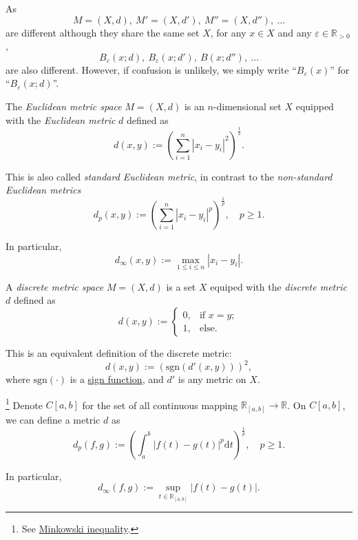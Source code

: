 \begin{note}
	As
	$$
	M = (X, d), \ M' = (X, d'), \ M'' = (X, d''), \ \ldots
	$$
	are different although they share the same set $X$, for any $x \in X$ and any $\varepsilon \in \mathbb R_{> 0}$,
	$$
	B_\varepsilon(x; d),\ B_\varepsilon (x; d'), \ B(x; d''), \ \ldots
	$$
	are also different. However, if confusion is unlikely, we simply write ``$B_\varepsilon(x)$'' for ``$B_\varepsilon(x; d)$''.
\end{note}


\begin{example}
	The \textit{Euclidean metric space} $M = (X, d)$ is an $n$-dimensional set $X$ equipped with the \textit{Euclidean metric} $d$ defined as
	$$
	d(x,y) := \left( \sum_{i = 1}^n |x_i - y_i|^2 \right)^\frac{1}{2}.
	$$
	
	This is also called \textit{standard Euclidean metric}, in contrast to the \textit{non-standard Euclidean metrics}
	$$
	d_p(x,y) := \left( \sum_{i = 1}^n |x_i - y_i|^p \right)^\frac{1}{p}, \quad p \ge 1.
	$$
	
	In particular,
	$$
	d_\infty (x,y) := \max_{1 \le i \le n} |x_i - y_i|.
	$$
\end{example}


\begin{example}
	A \textit{discrete metric space} $M = (X, d)$ is a set $X$ equiped with the \textit{discrete metric} $d$ defined as
	$$
	d(x,y) :=
	\begin{cases}
		0, & \text{if $x = y$}; \\
		1, & \text{else}.
	\end{cases}
	$$
	
	This is an equivalent definition of the discrete metric:
	$$
	d(x, y) := (\mathrm{sgn}(d'(x,y)))^2,
	$$
	where $\mathrm{sgn}(\cdot)$ is a \href{https://en.wikipedia.org/wiki/Sign_function}{sign function}, and $d'$ is any metric on $X$.
\end{example}


\begin{example}
	\footnote{
		See \href{https://en.wikipedia.org/wiki/Minkowski_inequality}{Minkowski inequality}.
	}
	Denote $C[a,b]$ for the set of all continuous mapping $\mathbb R_{[a,b]} \to \mathbb R$. On $C[a,b]$, we can define a metric $d$ as
	$$
	d_p(f, g) := \left( \int_{a}^{b} |f(t) - g(t)|^p \mathrm{d} t \right)^\frac{1}{p}, \quad p \ge 1.
	$$
	
	In particular,
	$$
	d_\infty (f,g) := \sup_{t \in \mathbb R_{[a,b]}} |f(t) - g(t)|.
	$$
\end{example}


